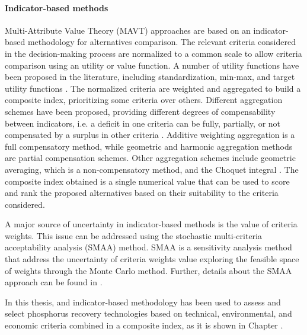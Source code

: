 \begin{refsection}[referencesCh1]
\paragraph{Indicator-based methods}
Multi-Attribute Value Theory (MAVT) approaches are based on an indicator-based methodology for alternatives comparison. The relevant criteria considered in the decision-making process are normalized to a common scale to allow criteria comparison using an utility or value function. A number of utility functions have been proposed in the literature, including standardization, min-max, and target utility functions \citep{HandbookCompositeIndicators}. 
The normalized criteria 
are weighted and aggregated to build a composite index, prioritizing some criteria over others. Different aggregation schemes have been proposed, providing different degrees of compensability between indicators, i.e. a deficit in one criteria can be fully, partially, or not compensated by a surplus in other criteria \citep{MarcoCinelli2020}. Additive weighting aggregation is a full compensatory method, while geometric and  harmonic aggregation methods are partial  compensation schemes. Other aggregation schemes include geometric averaging, which is a non-compensatory method, and the Choquet integral \citep{marichal2000determination}. The composite index obtained is a single numerical value that can be used to score and rank the proposed alternatives based on their suitability to the criteria considered. 

A major source of uncertainty in indicator-based methods is the value of criteria weights. This issue can be addressed using the stochastic multi-criteria acceptability analysis (SMAA) method. SMAA is a sensitivity analysis method that address the uncertainty of criteria weights value exploring the feasible space of weights through the Monte Carlo method. Further, details about the SMAA approach can be found in \citet{tervonen_implementing_2007}.

In this thesis, and indicator-based methodology has been used to assess and select phosphorus recovery technologies based on technical, environmental, and economic criteria combined in a composite index, as it is shown in Chapter \label{ch:Tool}.


\end{refsection}
